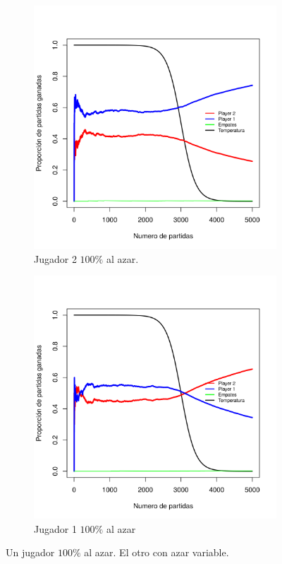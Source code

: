 \documentclass[11pt, spanish]{article}
\begin{document}
\begin{figure}[H]
    \centering
    \begin{subfigure}[b]{0.45\textwidth}
      \includegraphics[width=\textwidth]{Imagenes/SinVision_disipacion_QsinVison}
      \caption{Jugador 2 $100\%$ al azar.}
    \end{subfigure}
    \begin{subfigure}[b]{0.45\textwidth}
      \includegraphics[width=\textwidth]{Imagenes/SinVision_disipacion_QsinVison_reverse}
      \caption{Jugador 1 $100\%$ al azar}
    \end{subfigure}
    \caption{Un jugador $100\%$ al azar. El otro con azar variable.}
\end{figure}
\end{document}
